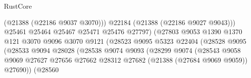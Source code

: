 \begin{lexlean}{RustCore}
\begin{coremodule}
                                                    (@21388 (@22186 @9037 @3070)))
                                                  @22184
                                                  (@21388 (@22186 @9027 @9043)))
                                                @25461
                                                @25464
                                                @25467
                                                @25471
                                                @25476
                                                @27797)
                                              (@27803
                                                @9053
                                                @1390
                                                @1370
                                                @121
                                                @3070
                                                @9096
                                                @3070
                                                @9121
                                                (@28523
                                                  @9095
                                                  @5323
                                                  @22404
                                                  (@28528
                                                    @9095
                                                    (@28533
                                                      @9094
                                                      @28028
                                                      (@28538
                                                        @9074
                                                        @9093
                                                        (@28299
                                                          @9074
                                                          (@28543
                                                            @9058
                                                            @9069
                                                            @27627
                                                            @27656
                                                            @27662
                                                            @28312
                                                            @27682
                                                            (@21388 (@27684 @9069 @9059))
                                                            @27690))
                                                        (@28560

\end{coremodule}
\end{lexlean}
